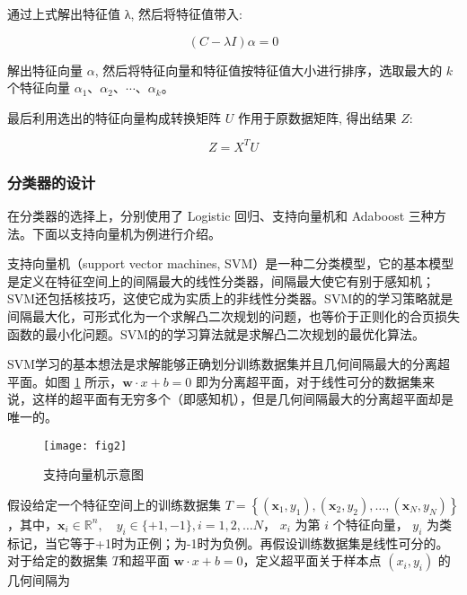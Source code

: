 通过上式解出特征值 λ, 然后将特征值带入:

\begin{equation}
(C-\lambda I) \alpha=0
\end{equation}

解出特征向量 $\alpha$, 然后将特征向量和特征值按特征值大小进行排序，选取最大的 $k$ 个特征向量 $\alpha_1、 \alpha_2、\cdots、\alpha_k$。

最后利用选出的特征向量构成转换矩阵 $U$ 作用于原数据矩阵, 得出结果 $Z$:

\begin{equation}
Z=X^T U
\end{equation}

\vspace{0.3cm}



\subsubsection{分类器的设计}

在分类器的选择上，分别使用了 Logistic 回归、支持向量机和 Adaboost 三种方法。下面以支持向量机为例进行介绍。

支持向量机（support vector machines, SVM）是一种二分类模型，它的基本模型是定义在特征空间上的间隔最大的线性分类器，间隔最大使它有别于感知机；SVM还包括核技巧，这使它成为实质上的非线性分类器。SVM的的学习策略就是间隔最大化，可形式化为一个求解凸二次规划的问题，也等价于正则化的合页损失函数的最小化问题。SVM的的学习算法就是求解凸二次规划的最优化算法。

SVM学习的基本想法是求解能够正确划分训练数据集并且几何间隔最大的分离超平面。如图 \ref{fig:svm} 所示，$\boldsymbol{w} \cdot x+b=0$ 即为分离超平面，对于线性可分的数据集来说，这样的超平面有无穷多个（即感知机），但是几何间隔最大的分离超平面却是唯一的。


\begin{figure}[!ht]
  \centering
  \texttt{[image: fig2]}
  \caption{支持向量机示意图}
  \label{fig:svm}
  \vspace{-0.5cm}
\end{figure}

假设给定一个特征空间上的训练数据集 $T=\left\{\left(\boldsymbol{x}_1, y_1\right),\left(\boldsymbol{x}_2, y_2\right), \ldots,\left(\boldsymbol{x}_N, y_N\right)\right\}$，其中，$\boldsymbol{x}_i \in \mathbb{R}^n, \quad y_i \in\{+1,-1\}, i=1,2, \ldots N$， $x_i$ 为第 $i$ 个特征向量， $y_i$ 为类标记，当它等于+1时为正例；为-1时为负例。再假设训练数据集是线性可分的。对于给定的数据集 $T$和超平面 $\boldsymbol{w} \cdot x+b=0$，定义超平面关于样本点 $(x_i,y_i)$ 的几何间隔为

